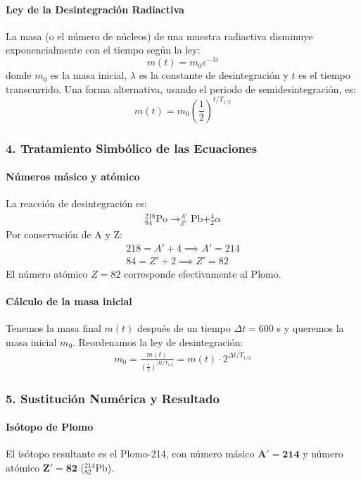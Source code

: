 \paragraph*{Ley de la Desintegración Radiactiva}
La masa (o el número de núcleos) de una muestra radiactiva disminuye exponencialmente con el tiempo según la ley:
$$ m(t) = m_0 e^{-\lambda t} $$
donde $m_0$ es la masa inicial, $\lambda$ es la constante de desintegración y $t$ es el tiempo transcurrido. Una forma alternativa, usando el periodo de semidesintegración, es:
$$ m(t) = m_0 \left(\frac{1}{2}\right)^{t/T_{1/2}} $$

\subsubsection*{4. Tratamiento Simbólico de las Ecuaciones}
\paragraph*{Números másico y atómico}
La reacción de desintegración es:
\begin{gather}
    ^{218}_{84}\text{Po} \rightarrow ^{A'}_{Z'}\text{Pb} + ^{4}_{2}\alpha
\end{gather}
Por conservación de A y Z:
\begin{gather}
    218 = A' + 4 \implies A' = 214 \\
    84 = Z' + 2 \implies Z' = 82
\end{gather}
El número atómico $Z=82$ corresponde efectivamente al Plomo.

\paragraph*{Cálculo de la masa inicial}
Tenemos la masa final $m(t)$ después de un tiempo $\Delta t = 600$ s y queremos la masa inicial $m_0$. Reordenamos la ley de desintegración:
\begin{gather}
    m_0 = \frac{m(t)}{\left(\frac{1}{2}\right)^{\Delta t/T_{1/2}}} = m(t) \cdot 2^{\Delta t/T_{1/2}}
\end{gather}

\subsubsection*{5. Sustitución Numérica y Resultado}
\paragraph*{Isótopo de Plomo}
\medskip
\begin{cajaresultado}
El isótopo resultante es el Plomo-214, con número másico $\boldsymbol{A'=214}$ y número atómico $\boldsymbol{Z'=82}$ ($^{214}_{82}$Pb).
\end{cajaresultado}

